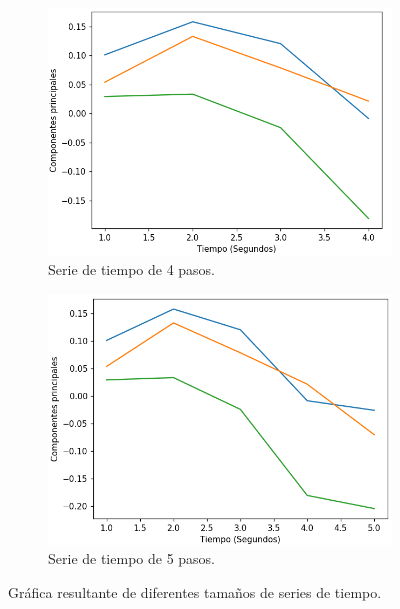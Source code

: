 \begin{figure}[H]
{\begin{varwidth}{\textwidth}
        \begin{subfigure}[h]{0.45\textwidth} 
            \includegraphics[width=\textwidth]{imagenes/Cap4/pca3-4}
            \caption{Serie de tiempo de 4 pasos.}
            \label{fig:max}
        \end{subfigure}       
        \begin{subfigure}[h]{0.45\textwidth} 
            \includegraphics[width=\textwidth]{imagenes/Cap4/pca3-5}
            \caption{Serie de tiempo de 5 pasos.}
            \label{fig:robust}
        \end{subfigure}
        \end{varwidth}}
        \caption{Gr\'{a}fica resultante de diferentes tama\~{n}os de series de tiempo.}
        
		\label{fig:series-de-tiempo}
    \end{figure}
